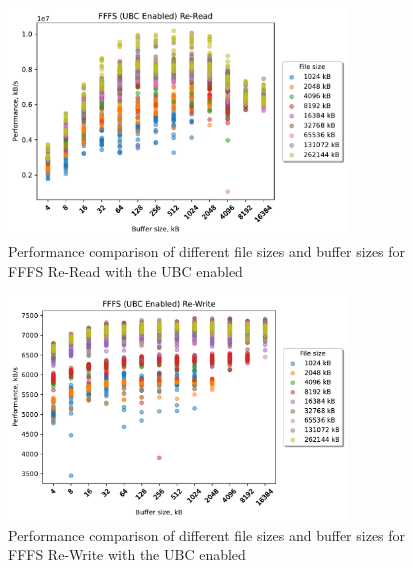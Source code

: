 \begin{figure}[!htb]
	\label{fig:bench_fffs_no_ubc_scatter_re-read}
	\begin{center}
		\includegraphics[width=0.8\textwidth]{figures.nosync/benchmarking/FFFS/scatter-UBC Enabled-Re-Read.pdf}
	\end{center}
	\caption[Comparison of Re-Read performance for file size and buffer size of FFFS with the UBC disabled]{Performance comparison of different file sizes and buffer sizes for FFFS Re-Read with the UBC enabled}
\end{figure}
\begin{figure}[!htb]
	\label{fig:bench_fffs_no_ubc_scatter_re-write}
	\begin{center}
		\includegraphics[width=0.8\textwidth]{figures.nosync/benchmarking/FFFS/scatter-UBC Enabled-Re-Write.pdf}
	\end{center}
	\caption[Comparison of Re-Write performance for file size and buffer size of FFFS with the UBC disabled]{Performance comparison of different file sizes and buffer sizes for FFFS Re-Write with the UBC enabled}
\end{figure}
\clearpage
